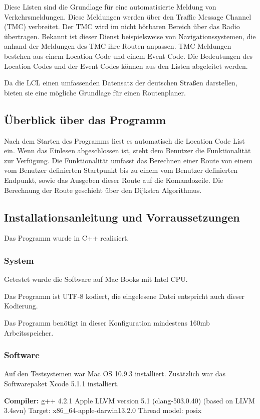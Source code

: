 \documentclass[12pt, a4paper, ngerman]{article}
\begin{document}
Diese Listen sind die Grundlage für eine automatisierte Meldung von Verkehrsmeldungen. Diese Meldungen werden über den Traffic Message Channel (TMC) verbreitet. Der TMC wird im nicht hörbaren Bereich über das Radio übertragen. Bekannt ist dieser Dienst beispielsweise von Navigationssystemen, die anhand der Meldungen des TMC ihre Routen anpassen. TMC Meldungen bestehen aus einem Location Code und einem Event Code. Die Bedeutungen des Location Codes und der Event Codes können aus den Listen abgeleitet werden.

Da die LCL einen umfassenden Datensatz der deutschen Straßen darstellen, bieten sie eine mögliche Grundlage für einen Routenplaner. 

\subsection{Überblick über das Programm}
Nach dem Starten des Programms liest es automatisch die Location Code List ein. Wenn das Einlesen abgeschlossen ist, steht dem Benutzer die Funktionalität zur Ver\-fügung. Die Funktionalität umfasst das Berechnen einer Route von einem vom Benutzer definierten Startpunkt bis zu einem vom Benutzer definierten Endpunkt, sowie das Ausgeben dieser Route auf die Komandozeile. Die Berechnung der Route geschieht über den Dijkstra Algorithmus.

\subsection{Installationsanleitung und Vorraussetzungen}
Das Programm wurde in C++ realisiert. 
\subsubsection{System}
Getestet wurde die Software auf Mac Books mit Intel CPU.

Das Programm ist UTF-8 kodiert, die eingelesene Datei entspricht auch dieser Kodierung.

Das Programm benötigt in dieser Konfiguration mindestens 160mb Arbeitsspeicher.

\subsubsection{Software}
Auf den Testsystemen war Mac OS 10.9.3 installiert. Zusätzlich war das Softwarepaket Xcode 5.1.1 installiert. 

\textbf{Compiler:}\newline
 g++ 4.2.1  \newline
Apple LLVM version 5.1 (clang-503.0.40) (based on LLVM 3.4svn) \newline
Target: x86\_64-apple-darwin13.2.0 \newline
Thread model: posix
\end{document}
